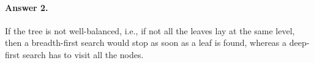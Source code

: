 \paragraph{Answer 2.} If the tree is not well-balanced, i.e., if not
all the leaves lay at the same level, then a breadth-first search
would stop as soon as a leaf is found, whereas a deep-first search has
to visit all the nodes.
